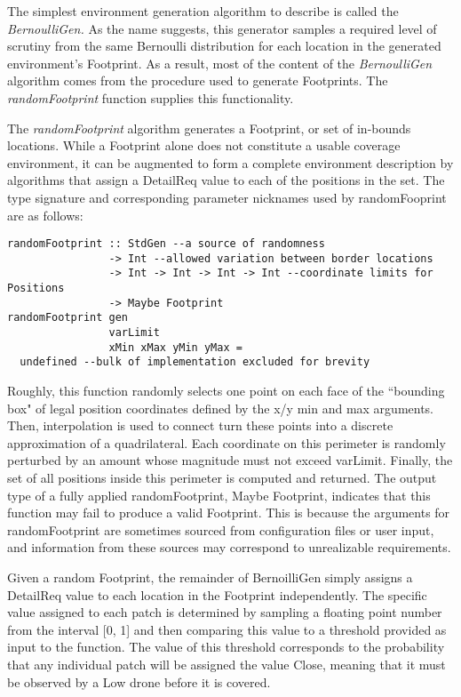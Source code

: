 The simplest environment generation algorithm to describe is called the \textit{BernoulliGen.} As the name suggests, this generator samples a required level of scrutiny from the same Bernoulli distribution for each location in the generated environment's Footprint. As a result, most of the content of the \textit{BernoulliGen} algorithm comes from the procedure used to generate Footprints. The \textit{randomFootprint} function supplies this functionality.

The \textit{randomFootprint} algorithm generates a Footprint, or set of in-bounds locations. While a Footprint alone does not constitute a usable coverage environment, it can be augmented to form a complete environment description by algorithms that assign a DetailReq value to each of the positions in the set. The type signature and corresponding parameter nicknames used by randomFooprint are as follows:

\begin{verbatim}
randomFootprint :: StdGen --a source of randomness
                -> Int --allowed variation between border locations
                -> Int -> Int -> Int -> Int --coordinate limits for Positions
                -> Maybe Footprint
randomFootprint gen 
                varLimit 
                xMin xMax yMin yMax =
  undefined --bulk of implementation excluded for brevity
\end{verbatim}

Roughly, this function randomly selects one point on each face of the ``bounding box" of legal position coordinates defined by the x/y min and max arguments. Then, interpolation is used to connect turn these points into a discrete approximation of a quadrilateral. Each coordinate on this perimeter is randomly perturbed by an amount whose magnitude must not exceed varLimit. Finally, the set of all positions inside this perimeter is computed and returned. The output type of a fully applied randomFootprint, Maybe Footprint, indicates that this function may fail to produce a valid Footprint. This is because the arguments for randomFootprint are sometimes sourced from configuration files or user input, and information from these sources may correspond to unrealizable requirements.

Given a random Footprint, the remainder of BernoilliGen simply assigns a DetailReq value to each location in the Footprint independently. The specific value assigned to each patch is determined by sampling a floating point number from the interval [0, 1] and then comparing this value to a threshold provided as input to the function. The value of this threshold corresponds to the probability that any individual patch will be assigned the value Close, meaning that it must be observed by a Low drone before it is covered.

